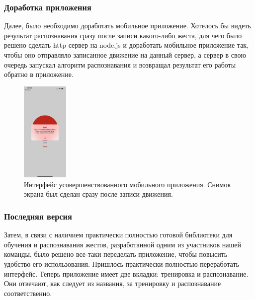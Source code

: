 \subsubsection{Доработка приложения }
Далее, было необходимо доработать мобильное приложение. Хотелось бы видеть результат распознавания сразу после записи какого-либо жеста, для чего было решено сделать http сервер на node.js и доработать мобильное приложение так, чтобы оно отправляло записанное движение на данный сервер, а сервер в свою очередь запускал алгоритм распознавания и возвращал результат его работы обратно в приложение.
\begin{figure}[H]
    \begin{center}
        \includegraphics[width=0.2\textwidth]{max_kt2_images/image5.jpg}
    \end{center}
    \caption{Интерфейс усовершенствованного мобильного приложения. Снимок экрана был сделан сразу после записи движения.}
\end{figure}

\subsubsection{Последняя версия}
Затем, в связи с наличием практически полностью готовой библиотеки для обучения и распознавания жестов, разработанной одним из участников нашей команды, было решено все-таки переделать приложение, чтобы повысить удобство его использования. Пришлось практически полностью переработать интерфейс. Теперь приложение имеет две вкладки: тренировка и распознавание. Они отвечают, как следует из названия, за тренировку и распознавание соответственно.

